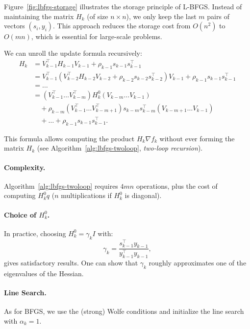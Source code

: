 \begin{figureexplanation}
Figure~\ref{fig:lbfgs-storage} illustrates the storage principle of L-BFGS. Instead of maintaining the matrix $H_k$ (of size $n \times n$), we only keep the last $m$ pairs of vectors $(s_i, y_i)$. This approach reduces the storage cost from $O(n^2)$ to $O(mn)$, which is essential for large-scale problems.
\end{figureexplanation}

We can unroll the update formula recursively:
\begin{align*}
    H_k &= V_{k-1}^\top H_{k-1} V_{k-1} + \rho_{k-1} s_{k-1} s_{k-1}^\top \\
    &= V_{k-1}^\top (V_{k-2}^\top H_{k-2} V_{k-2} + \rho_{k-2} s_{k-2} s_{k-2}^\top) V_{k-1} + \rho_{k-1} s_{k-1} s_{k-1}^\top \\
    &= \dots \\
    &= (V_{k-1}^\top \dots V_{k-m}^\top) H_k^0 (V_{k-m} \dots V_{k-1}) \\
    &\quad + \rho_{k-m} (V_{k-1}^\top \dots V_{k-m+1}^\top) s_{k-m} s_{k-m}^\top (V_{k-m+1} \dots V_{k-1}) \\
    &\quad + \dots + \rho_{k-1} s_{k-1} s_{k-1}^\top.
\end{align*}

This formula allows computing the product $H_k \nabla f_k$ without ever forming the matrix $H_k$ (see Algorithm~\ref{alg:lbfgs-twoloop}, \textit{two-loop recursion}).

\paragraph{Complexity.}
Algorithm~\ref{alg:lbfgs-twoloop} requires $4mn$ operations, plus the cost of computing $H_k^0 q$ ($n$ multiplications if $H_k^0$ is diagonal).

\paragraph{Choice of $H_k^0$.}
In practice, choosing $H_k^0 = \gamma_k I$ with:
\begin{equation}
    \gamma_k = \frac{s_{k-1}^\top y_{k-1}}{y_{k-1}^\top y_{k-1}},
\end{equation}
gives satisfactory results. One can show that $\gamma_k$ roughly approximates one of the eigenvalues of the Hessian.

\paragraph{Line Search.}
As for BFGS, we use the (strong) Wolfe conditions and initialize the line search with $\alpha_k = 1$.

